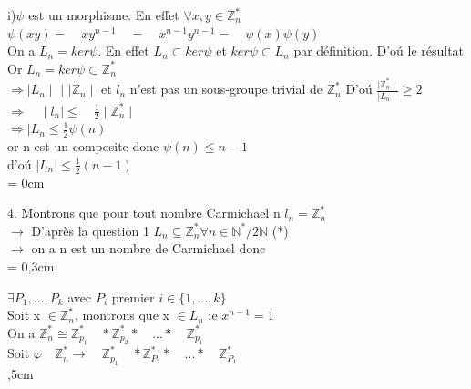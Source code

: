 \documentclass[10pt]{beamer}
\begin{document}
\begin{frame}

\parindent=0cm
i)$ \psi$ est un morphisme. En effet $ \forall x,y \in \mathbb{Z}_n^*$\\
$ \psi (xy)= \quad xy^{n-1} \quad = \quad x^{n-1}y^{n-1}= \quad\psi(x)\psi(y)$\\
On a $L_n = ker\psi$. \quad En effet $L_n \subset ker\psi$ et $ker\psi \subset L_n $ par d\'efinition. D'o\'u le r\'esultat\\
Or $L_n = ker\psi \subset \mathbb{Z}_n^* $\\
$\Longrightarrow \mid L_n \mid$ \Huge{$\mid$} \normalsize {$\mid\mathbb{Z}_n\mid$} et $l_n$ n'est pas un sous-groupe trivial de $\mathbb{Z}_n^*$
D'o\'u $\frac{\mid\mathbb{Z}_n^*\mid}{\mid L_n \mid}\geq 2$ $ \Longrightarrow \quad \mid l_n \mid \leq \quad \frac{1}{2} \mid \mathbb{Z}_n^*\mid$\\

$\Longrightarrow \mid L_n \leq \frac{1}{2} \psi(n)$\\
or n est un composite donc $\psi(n)\leq n-1$\\
d'o\'u $\mid L_n \mid \leq \frac{1}{2} (n-1)$\\
 \parindent = 0cm

4. Montrons que pour tout nombre Carmichael n $l_n = \mathbb{Z}_n^*$\\

$\rightarrow$ D'apr\`es la question 1 $L_n \subseteq \mathbb{Z}_n^* \forall n \in \mathbb{N}^{*}/2\mathbb{N}$ \hfill(*)\\
$\rightarrow$ on a n est un nombre de Carmichael donc\\
\parindent = 0,3cm

$\exists P_1,...,P_k$ avec $P_i$ premier $ i \in
\{1,...,k\}$\\
Soit x $\in \mathbb{Z}_n^*$, montrons que x $ \in L_n$ ie $x^{n-1}=1$\\
On a $ \mathbb{Z}_n^* \cong \mathbb{Z}_{{p}_{1}}^{*} \quad *\mathbb{Z}_{{p}_{2}}^{*} * \quad ... *\quad \mathbb{Z}_{{p}_{1}}^{*}$\\

Soit $\varphi \quad \mathbb{Z}_n^* \longrightarrow \quad \mathbb{Z}_{{p}_{1}}^{*} \quad *\mathbb{Z}_{{P}_{2}}^{*} * \quad ... *\quad \mathbb{Z}_{{P}_{1}}^{*}$ \\
,5cm

\end{frame}
\end{document}
